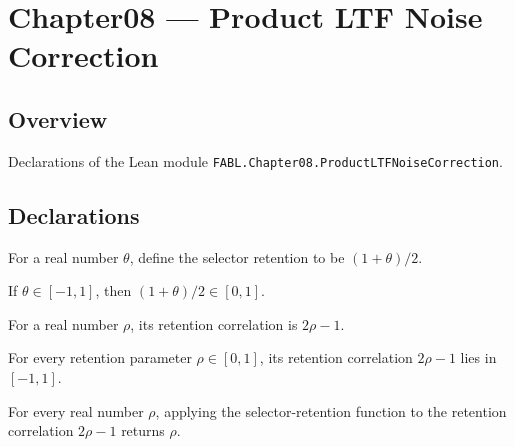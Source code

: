 \chapter{Chapter08 — Product LTF Noise Correction}
\section{Overview}

Declarations of the Lean module \texttt{FABL.Chapter08.ProductLTFNoiseCorrection}.

\section{Declarations}

\begin{definition}
\label{FABL.selectorRetention}
\leanok
For a real number $\theta$, define the selector retention to be $(1+\theta)/2$.
\end{definition}

\begin{theorem}
\label{FABL.selectorRetention_mem_Icc}
\leanok
{}
If $\theta\in[-1,1]$, then $(1+\theta)/2\in[0,1]$.
\end{theorem}

\begin{definition}
\label{FABL.retentionCorrelation}
\leanok
For a real number $\rho$, its retention correlation is $2\rho-1$.
\end{definition}

\begin{theorem}
\label{FABL.retentionCorrelation_mem_Icc}
\leanok
{}
For every retention parameter $\rho\in[0,1]$, its retention correlation $2\rho-1$ lies
in $[-1,1]$.
\end{theorem}

\begin{theorem}
\label{FABL.selectorRetention_retentionCorrelation}
\leanok
{}
For every real number $\rho$, applying the selector-retention function to the retention
correlation $2\rho-1$ returns $\rho$.
\end{theorem}

